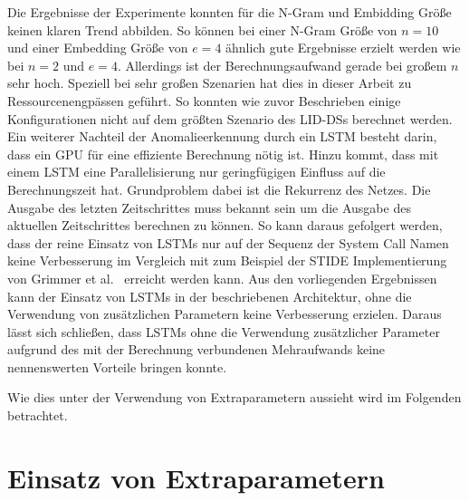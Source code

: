 Die Ergebnisse der Experimente konnten für die N-Gram und Embidding Größe keinen klaren Trend abbilden.
So können bei einer N-Gram Größe von $n=10$ und einer Embedding Größe von $e=4$ ähnlich gute Ergebnisse erzielt werden wie bei $n=2$ und $e=4$.
Allerdings ist der Berechnungsaufwand gerade bei großem $n$ sehr hoch.
Speziell bei sehr großen Szenarien hat dies in dieser Arbeit zu Ressourcenengpässen geführt.
So konnten wie zuvor Beschrieben einige Konfigurationen nicht auf dem größten Szenario des \acp{LID-DS} berechnet werden.
Ein weiterer Nachteil der Anomalieerkennung durch ein \ac{LSTM} besteht darin, dass ein GPU für eine effiziente Berechnung nötig ist.
Hinzu kommt, dass mit einem \ac{LSTM} eine Parallelisierung nur geringfügigen Einfluss auf die Berechnungszeit hat.
Grundproblem dabei ist die Rekurrenz des Netzes. 
Die Ausgabe des letzten Zeitschrittes muss bekannt sein um die Ausgabe des aktuellen Zeitschrittes berechnen zu können.
So kann daraus gefolgert werden, dass der reine Einsatz von \acp{LSTM} nur auf der Sequenz der System Call Namen keine Verbesserung im Vergleich mit zum Beispiel der \ac{STIDE} Implementierung von Grimmer et al.~\cite{IDSTHREADGRIMMER2021} erreicht werden kann.
Aus den vorliegenden Ergebnissen kann der Einsatz von \acp{LSTM} in der beschriebenen Architektur, ohne die Verwendung von zusätzlichen Parametern keine Verbesserung erzielen.
Daraus lässt sich schließen, dass \acp{LSTM} ohne die Verwendung zusätzlicher Parameter aufgrund des mit der Berechnung verbundenen Mehraufwands keine nennenswerten Vorteile bringen konnte.

Wie dies unter der Verwendung von Extraparametern aussieht wird im Folgenden betrachtet.

\section{Einsatz von Extraparametern}\label{sec:folgerungen_extra}

